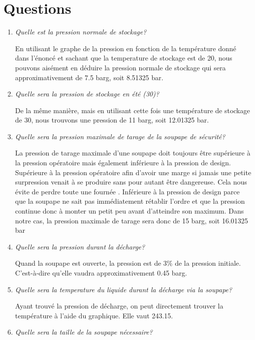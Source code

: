\documentclass{report}
\begin{document}
\section*{Questions}
\begin{enumerate}
\item\textit{Quelle est la pression normale de stockage?}

En utilisant le graphe de la pression en fonction de la température donné dans l'énoncé et sachant que la temperature de stockage est de 20\celsius , nous pouvons aisément en déduire la pression normale de stockage qui sera approximativement de 7.5 barg, soit 8.51325 bar.

\item\textit{Quelle sera la pression de stockage en été (30\celsius)?}

De la même manière, mais en utilisant cette fois une température de stockage de 30\celsius , nous trouvons une pression de 11 barg, soit 12.01325 bar.

\item\textit{Quelle sera la pression maximale de tarage de la soupape de sécurité?}

La pression de tarage maximale d'une soupape doit toujours être supérieure à la pression opératoire mais également inférieure à la pression de design. Supérieure à la pression opératoire afin d'avoir une marge si jamais une petite surpression venait à se produire sans pour autant être dangereuse. Cela nous évite de perdre toute une \og fournée \fg. Inférieure à la pression de design parce que la soupape ne sait pas immédiatement rétablir l'ordre et que la pression continue donc à monter un petit peu avant d'atteindre son maximum. 
Dans notre cas, la pression maximale de tarage sera donc de 15 barg, soit 16.01325 bar 

\item\textit{Quelle sera la pression durant la décharge?}

Quand la soupape est ouverte, la pression est de 3\% de la pression initiale. C'est-à-dire qu'elle vaudra approximativement 0.45 barg.

\item\textit{Quelle sera la temperature du liquide durant la décharge via la soupape?}

Ayant trouvé la pression de décharge, on peut directement trouver la température à l'aide du graphique. Elle vaut 243.15\kelvin.

\item\textit{Quelle sera la taille de la soupape nécessaire?}


\end{enumerate}
\end{document}
